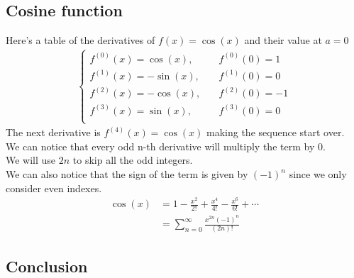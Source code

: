 \documentclass{article}
\begin{document}
\subsection{Cosine function}

Here's a table of the derivatives of \(f(x)=\cos(x)\) and their value at \(a=0\)
\begin{align*}
	\begin{cases}
		f^{(0)}(x)=\cos(x), \quad &f^{(0)}(0)=1 \\
		f^{(1)}(x)=-\sin(x),\quad &f^{(1)}(0)=0 \\
		f^{(2)}(x)=-\cos(x),\quad &f^{(2)}(0)=-1\\
		f^{(3)}(x)=\sin(x), \quad &f^{(3)}(0)=0 \\
	\end{cases}
\end{align*}
The next derivative is \(f^{(4)}(x)=\cos(x)\) making the sequence start over.
\\
We can notice that every odd n-th derivative will multiply the term by \(0\).
\\
We will use \(2n\) to skip all the odd integers.
\\
We can also notice that the sign of the term is given by \({(-1)}^n\) since we only consider even indexes.
\begin{align*}
	\cos(x)&=1-\frac{x^2}{2!}+\frac{x^4}{4!}-\frac{x^6}{6!}+\cdots
	\\
	&=\sum_{n=0}^{\infty}\frac{x^{2n}{(-1)}^n}{(2n)!}
\end{align*}

\pagebreak

\subsection{Conclusion}
\end{document}
